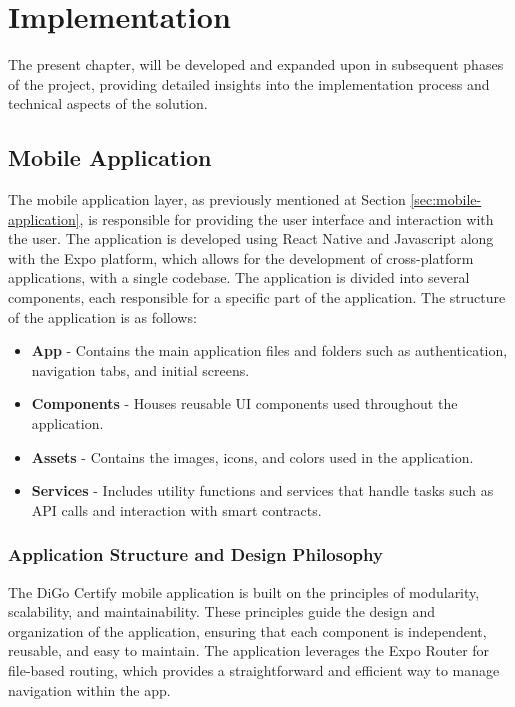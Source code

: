 %
%
\chapter{Implementation}\label{chap:implementation}

The present chapter, will be developed and expanded upon in subsequent phases of the project, providing detailed insights into the implementation process and technical aspects of the solution.

\section{Mobile Application}\label{sec:mobile-application-implementation}

The mobile application layer, as previously mentioned at Section \ref*{sec:mobile-application}, is responsible for providing the user interface and interaction with the user. The application is developed using React Native\cite{ReactNativeBook} and Javascript\cite{Javascript} along with the Expo platform, which allows for the development of cross-platform applications, with a single codebase. The application is divided into several components, each responsible for a specific part of the application. The structure of the application is as follows:

\begin{itemize}
    \item \textbf{App} - Contains the main application files and folders such as authentication, navigation tabs, and initial screens.
    \item \textbf{Components} - Houses reusable UI components used throughout the application.
    \item \textbf{Assets} - Contains the images, icons, and colors used in the application.
    \item \textbf{Services} - Includes utility functions and services that handle tasks such as API calls and interaction with smart contracts.
\end{itemize}

\subsection{Application Structure and Design Philosophy}

The DiGo Certify mobile application is built on the principles of modularity, scalability, and maintainability. These principles guide the design and organization of the application, ensuring that each component is independent, reusable, and easy to maintain. The application leverages the Expo Router\cite{Expo-Router} for file-based routing, which provides a straightforward and efficient way to manage navigation within the app.

